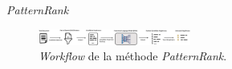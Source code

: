 \begin{frame}{\textit{PatternRank}}
\begin{figure}
    \centering
    \includegraphics[width=50mm,scale=0.5]{pic/patternrank_workflow.png}
    \caption{\textit{Workflow} de la méthode \textit{PatternRank}.}
    \label{fig:enter-label}
\end{figure}
\citep{schopf2022}
\end{frame}